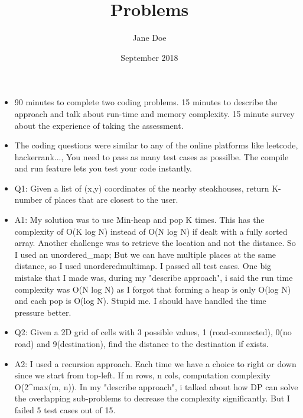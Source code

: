 \documentclass{article}
\title{Problems}
\author{Jane Doe}
\date{September 2018}
\begin{document}
\begin{itemize}
	\item 90 minutes to complete two coding problems. 15 minutes to describe the approach and talk about run-time and memory complexity. 15 minute survey about the experience of taking the assessment.
	\item The coding questions were similar to any of the online platforms like leetcode, hackerrank..., You need to pass as many test cases as possilbe. The compile and run feature lets you test your code instantly.
	\item Q1: Given a list of (x,y) coordinates of the nearby steakhouses, return K-number of places that are closest to the user.
	\item A1: My solution was to use Min-heap and pop K times. This has the complexity of O(K log N) instead of O(N log N) if dealt with a fully sorted array. Another challenge was to retrieve the location and not the distance. So I used an unordered_map; But we can have multiple places at the same distance, so I used unorderedmultimap. I passed all test cases. One big mistake that I made was, during my "describe approach", i said the run time complexity was O(N log N) as I forgot that forming a heap is only O(log N) and each pop is O(log N). Stupid me. I should have handled the time pressure better.
	\item Q2: Given a 2D grid of cells with 3 possible values, 1 (road-connected), 0(no road) and 9(destination), find the distance to the destination if exists.
	\item A2: I used a recursion approach. Each time we have a choice to right or down since we start from top-left. If m rows, n cols, computation complexity O(2^max(m, n)). In my "describe approach", i talked about how DP can solve the overlapping sub-problems to decrease the complexity significantly. But I failed 5 test cases out of 15.
\end{itemize}
\end{document}
